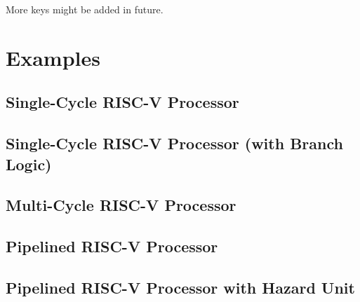 \documentclass[.52pt,a4paper,titlepage]{article}
\begin{document}
\vspace{\baselineskip}
More keys might be added in future.

\newpage
\section{Examples}
\subsection{Single-Cycle RISC-V Processor}
\begin{center}
	\resizebox*{\textwidth}{!}{
		
	}
\end{center}


\subsection{Single-Cycle RISC-V Processor (with Branch Logic)}
\begin{center}
	\resizebox*{\textwidth}{!}{
		
	}
\end{center}


\subsection{Multi-Cycle RISC-V Processor}
\begin{center}
	\resizebox*{\textwidth}{!}{
		
	}
	\resizebox*{\textwidth}{!}{
		
	}
\end{center}

\subsection{Pipelined RISC-V Processor}
\begin{center}
	\resizebox*{\textwidth}{!}{
		
	}
\end{center}

\subsection{Pipelined RISC-V Processor with Hazard Unit}
\begin{center}
	\resizebox*{\textwidth}{!}{
		
	}
\end{center}
\end{document}
